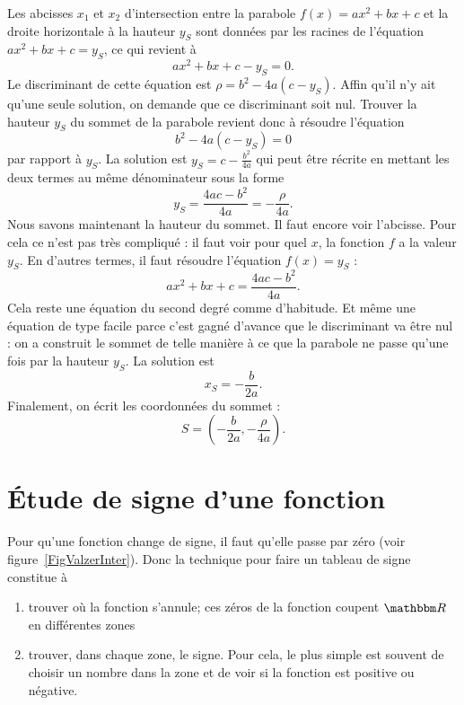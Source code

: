 Les abcisses $x_1$ et $x_2$ d'intersection entre la parabole $f(x)=ax^2+bx+c$ et la droite horizontale à la hauteur $y_S$ sont données par les racines de l'équation $ax^2+bx+c=y_S$, ce qui revient à
\[ 
  ax^2+bx+c-y_S=0.
\]
Le discriminant de cette équation est $\rho=b^2-4a(c-y_S)$. Affin qu'il n'y ait qu'une seule solution, on demande que ce discriminant soit nul. Trouver la hauteur $y_S$ du sommet de la parabole revient donc à résoudre l'équation
\[ 
  b^2-4a(c-y_S)=0
\]
par rapport à $y_S$. La solution est $y_S=c-\frac{ b^2 }{ 4a }$ qui peut être récrite en mettant les deux termes au même dénominateur sous la forme
\begin{equation}
	y_S=\frac{ 4ac-b^2 }{ 4a }=-\frac{ \rho }{ 4a }.
\end{equation}
Nous savons maintenant la hauteur du sommet. Il faut encore voir l'abcisse. Pour cela ce n'est pas très compliqué : il faut voir pour quel $x$, la fonction $f$ a la valeur $y_S$. En d'autres termes, il faut résoudre l'équation $f(x)=y_S$ :
\[ 
  ax^2+bx+c=\frac{ 4ac-b^2 }{ 4a }.
\]
Cela reste une équation du second degré comme d'habitude. Et même une équation de type facile parce c'est gagné d'avance que le discriminant va être nul : on a construit le sommet de telle manière à ce que la parabole ne passe qu'une fois par la hauteur $y_S$. La solution est 
\[ 
  x_S=-\frac{ b }{ 2a }.
\]
Finalement, on écrit les coordonnées du sommet :
\begin{equation}
S=\left( -\frac{ b }{ 2a },-\frac{ \rho }{ 4a } \right).
\end{equation}

%
%
 
\section{Étude de signe d'une fonction}

Pour qu'une fonction change de signe, il faut qu'elle passe par zéro (voir figure~\ref{FigValzerInter}). Donc la technique pour faire un tableau de signe constitue à
\begin{enumerate}
\item trouver où la fonction s'annule; ces zéros de la fonction coupent $\eR$ en différentes zones
\item trouver, dans chaque zone, le signe. Pour cela, le plus simple est souvent de choisir un nombre dans la zone et de voir si la fonction est positive ou négative.
\end{enumerate}

